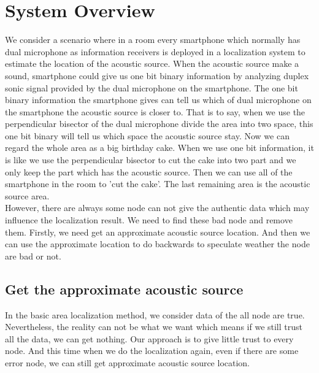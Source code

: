 \section{System Overview}
We consider a scenario where in a room every smartphone which normally has dual microphone as information receivers%
is deployed in a localization system to estimate the location of the acoustic source. When the acoustic source make a sound, smartphone could give us one bit binary information by analyzing duplex sonic signal provided by the dual microphone on the smartphone. The one bit binary information the smartphone gives can tell us which of dual microphone on the smartphone the acoustic source is closer to. That is to say, when we use the perpendicular bisector of the dual microphone divide the area into two space, this one bit binary will tell us which space the acoustic source stay. Now we can regard the whole area as a big birthday cake. When we use one bit information, it is like we use the perpendicular bisector to cut the cake into two part and we only keep the part which has the acoustic source. Then we can use all of the smartphone in the room to 'cut the cake'. The last remaining area is the acoustic source area.\\%
However, there are always some node can not give the authentic data which may influence the localization result. We need to find these bad node and remove them. Firstly, we need get an approximate acoustic source location. And then we can use the approximate location to do backwards to speculate weather the node are bad or not.\\
\subsection{Get the approximate acoustic source}
In the basic area localization method, we consider data of the all node are true. Nevertheless, the reality can not be what we want which means if we still trust all the data, we can get nothing. Our approach is to give little trust to every node. And this time when we do the localization again, even if there are some error node, we can still get approximate acoustic source location. 